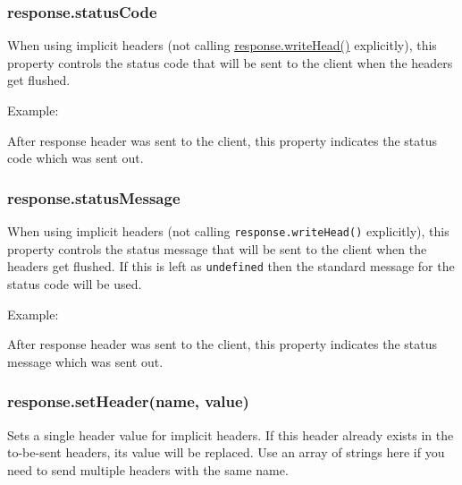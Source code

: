 \subsubsection{response.statusCode}\label{response.statuscode}

When using implicit headers (not calling
\hyperref[httpux5fresponseux5fwriteheadux5fstatuscodeux5freasonphraseux5fheaders]{response.writeHead()}
explicitly), this property controls the status code that will be sent to
the client when the headers get flushed.

Example:

\begin{Shaded}
\begin{Highlighting}[]
 \NormalTok{= }\NormalTok{;}
\end{Highlighting}
\end{Shaded}

After response header was sent to the client, this property indicates
the status code which was sent out.

\subsubsection{response.statusMessage}\label{response.statusmessage}

When using implicit headers (not calling \texttt{response.writeHead()}
explicitly), this property controls the status message that will be sent
to the client when the headers get flushed. If this is left as
\texttt{undefined} then the standard message for the status code will be
used.

Example:

\begin{Shaded}
\begin{Highlighting}[]
 \NormalTok{= }\NormalTok{;}
\end{Highlighting}
\end{Shaded}

After response header was sent to the client, this property indicates
the status message which was sent out.

\subsubsection{response.setHeader(name,
value)}\label{response.setheadername-value}

Sets a single header value for implicit headers. If this header already
exists in the to-be-sent headers, its value will be replaced. Use an
array of strings here if you need to send multiple headers with the same
name.

